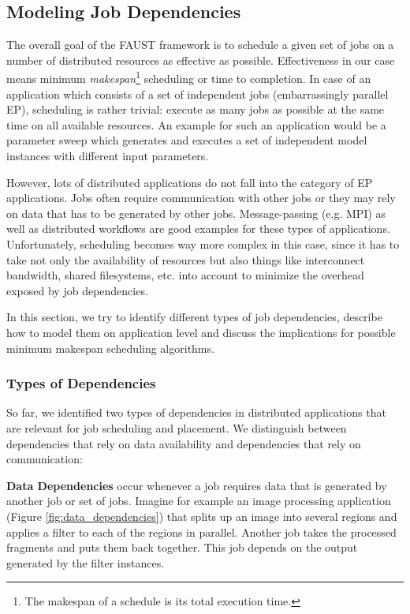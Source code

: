 \subsection{Modeling Job Dependencies}

The overall goal of the FAUST framework is to schedule a given set of jobs on a number of distributed resources as effective as possible. Effectiveness in our case means minimum \textit{makespan}\footnote{The makespan of a schedule is its total execution time.} scheduling or time to completion. In case of an application which consists of a
set of independent jobs (embarrassingly parallel EP), scheduling is rather trivial:
execute as many jobs as possible at the same time on all available resources. An
example for such an application would be a parameter sweep which generates and executes  a set of independent model instances with different input parameters.

However, lots of distributed applications do not fall into the category of EP applications. Jobs often require communication with other jobs or they may rely on data  that has to be generated by other jobs. Message-passing (e.g. MPI) as well as distributed workflows are good examples for these types of applications. Unfortunately, scheduling becomes way more complex in this case, since it has to take not only the availability of resources but also things like interconnect bandwidth, shared filesystems, etc. into account to minimize the overhead exposed by job dependencies.

In this section, we try to identify different types of job dependencies, describe how to model them on application level and discuss the implications for possible minimum 
makespan scheduling algorithms.

\subsubsection{Types of Dependencies}

So far, we identified two types of dependencies in distributed applications that are relevant for job scheduling and placement. We distinguish between dependencies that rely on data availability and dependencies that rely on communication:


\textbf{Data Dependencies} occur whenever a job requires data that is generated by another job or  set of jobs. Imagine for example an image processing application (Figure \ref{fig:data_dependencies}) that splits up an image into several regions and applies a filter to each of the regions in parallel. Another job takes the processed fragments and puts them back together. This job depends on the output generated by the filter instances. 

